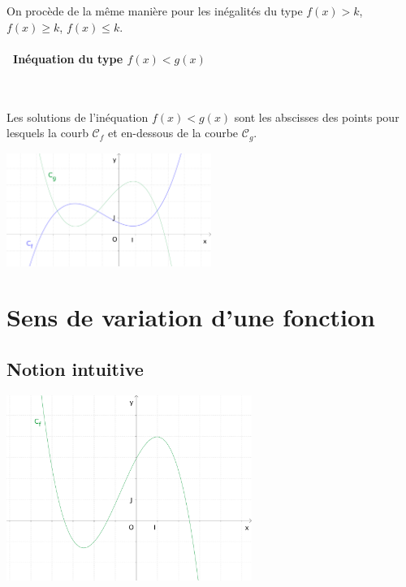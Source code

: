 \medskip

On procède de la même manière pour les inégalités du type $f(x)>k$,
$f(x)\geq k$, $f(x)\leq k$. 

\paragraph{\textbullet \ Inéquation du type $f(x)<g(x)$} \ \par
Les solutions de l'inéquation $f(x)<g(x)$ sont les abscisses des
points pour lesquels la courb $\mathscr{C}_f$ et en-dessous de la
courbe $\mathscr{C}_g$.

\medskip

{\centering
  \includegraphics[width=0.5\textwidth]{F_resineq_fg.pdf}
\par}



\section{Sens de variation d'une fonction}
\label{sec:variations}

\subsection{Notion intuitive}
\label{ssec:notion_intuitive}

\vspace{2cm}

\begin{center}
  \includegraphics[width=0.6\textwidth]{F_Variations.pdf}
\end{center}

